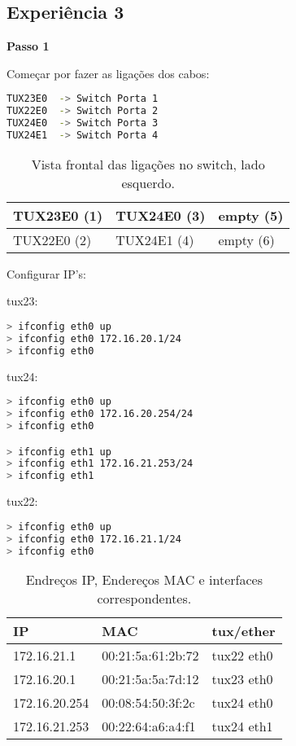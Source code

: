 \subsection{Experiência 3} \label{exp3_steps}

\textbf{Passo 1}

Começar por fazer as ligações dos cabos:

\begin{lstlisting}[language=bash]
TUX23E0  -> Switch Porta 1 
TUX22E0  -> Switch Porta 2
TUX24E0  -> Switch Porta 3
TUX24E1  -> Switch Porta 4
\end{lstlisting}

\begin{table}[h]
    \centering
    \begin{tabular}{|l|l|l|}
    \hline
        TUX23E0 (1) & TUX24E0 (3) & empty (5) \\ \hline
        TUX22E0 (2) & TUX24E1 (4) & empty (6) \\ \hline
    \end{tabular}
    \caption{\label{tab:table-name}Vista frontal das ligações no switch, lado esquerdo.}
\end{table}

Configurar IP's:

tux23:
\begin{lstlisting}[language=bash]
> ifconfig eth0 up
> ifconfig eth0 172.16.20.1/24
> ifconfig eth0 
\end{lstlisting}
tux24:
\begin{lstlisting}[language=bash]
> ifconfig eth0 up
> ifconfig eth0 172.16.20.254/24
> ifconfig eth0 

> ifconfig eth1 up
> ifconfig eth1 172.16.21.253/24
> ifconfig eth1 
\end{lstlisting}
tux22:
\begin{lstlisting}[language=bash]
> ifconfig eth0 up
> ifconfig eth0 172.16.21.1/24
> ifconfig eth0 
\end{lstlisting}

\begin{table}[h]
    \centering
    \begin{tabular}{|l|l|l|}
    \hline
        IP & MAC & tux/ether \\ \hline
        172.16.21.1 & 00:21:5a:61:2b:72 & tux22 eth0 \\ \hline
        172.16.20.1 & 00:21:5a:5a:7d:12 & tux23 eth0 \\ \hline
        172.16.20.254 & 00:08:54:50:3f:2c & tux24 eth0 \\ \hline
        172.16.21.253 & 00:22:64:a6:a4:f1 & tux24 eth1 \\ \hline
    \end{tabular}
    \caption{\label{tab:table-name}Endreços IP, Endereços MAC e interfaces correspondentes.}
\end{table}

